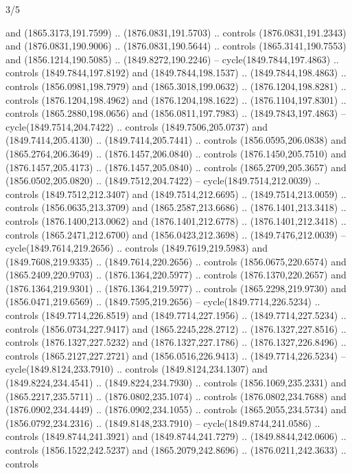 \begin{flagdescription}{3/5}
\begin{scope}[xshift=0.5\flaglength,yshift=0.5\flagwidth,scale=\flagwidth/99]
\begin{scope}[y=0.8pt, x=0.8pt, yscale=-0.20628, xscale=0.20628,shift={(-500,-300)}]
\begin{scope}[cm={{0.79646,0.0,0.0,0.7753,(100.0721,273.79617)}}]
\begin{scope}[cm={{1.1028,0.0,0.0,1.08434,(-41.46868,-11.26981)}}]
  and (1865.3173,191.7599) .. (1876.0831,191.5703) .. controls
  (1876.0831,191.2343) and (1876.0831,190.9006) .. (1876.0831,190.5644) ..
  controls (1865.3141,190.7553) and (1856.1214,190.5085) .. (1849.8272,190.2246)
  -- cycle(1849.7844,197.4863) .. controls (1849.7844,197.8192) and
  (1849.7844,198.1537) .. (1849.7844,198.4863) .. controls (1856.0981,198.7979)
  and (1865.3018,199.0632) .. (1876.1204,198.8281) .. controls
  (1876.1204,198.4962) and (1876.1204,198.1622) .. (1876.1104,197.8301) ..
  controls (1865.2880,198.0656) and (1856.0811,197.7983) .. (1849.7843,197.4863)
  -- cycle(1849.7514,204.7422) .. controls (1849.7506,205.0737) and
  (1849.7414,205.4130) .. (1849.7414,205.7441) .. controls (1856.0595,206.0838)
  and (1865.2764,206.3649) .. (1876.1457,206.0840) .. controls
  (1876.1450,205.7510) and (1876.1457,205.4173) .. (1876.1457,205.0840) ..
  controls (1865.2709,205.3657) and (1856.0502,205.0820) .. (1849.7512,204.7422)
  -- cycle(1849.7514,212.0039) .. controls (1849.7512,212.3407) and
  (1849.7514,212.6695) .. (1849.7514,213.0059) .. controls (1856.0635,213.3709)
  and (1865.2587,213.6686) .. (1876.1401,213.3418) .. controls
  (1876.1400,213.0062) and (1876.1401,212.6778) .. (1876.1401,212.3418) ..
  controls (1865.2471,212.6700) and (1856.0423,212.3698) .. (1849.7476,212.0039)
  -- cycle(1849.7614,219.2656) .. controls (1849.7619,219.5983) and
  (1849.7608,219.9335) .. (1849.7614,220.2656) .. controls (1856.0675,220.6574)
  and (1865.2409,220.9703) .. (1876.1364,220.5977) .. controls
  (1876.1370,220.2657) and (1876.1364,219.9301) .. (1876.1364,219.5977) ..
  controls (1865.2298,219.9730) and (1856.0471,219.6569) .. (1849.7595,219.2656)
  -- cycle(1849.7714,226.5234) .. controls (1849.7714,226.8519) and
  (1849.7714,227.1956) .. (1849.7714,227.5234) .. controls (1856.0734,227.9417)
  and (1865.2245,228.2712) .. (1876.1327,227.8516) .. controls
  (1876.1327,227.5232) and (1876.1327,227.1786) .. (1876.1327,226.8496) ..
  controls (1865.2127,227.2721) and (1856.0516,226.9413) .. (1849.7714,226.5234)
  -- cycle(1849.8124,233.7910) .. controls (1849.8124,234.1307) and
  (1849.8224,234.4541) .. (1849.8224,234.7930) .. controls (1856.1069,235.2331)
  and (1865.2217,235.5711) .. (1876.0802,235.1074) .. controls
  (1876.0802,234.7688) and (1876.0902,234.4449) .. (1876.0902,234.1055) ..
  controls (1865.2055,234.5734) and (1856.0792,234.2316) .. (1849.8148,233.7910)
  -- cycle(1849.8744,241.0586) .. controls (1849.8744,241.3921) and
  (1849.8744,241.7279) .. (1849.8844,242.0606) .. controls (1856.1522,242.5237)
  and (1865.2079,242.8696) .. (1876.0211,242.3633) .. controls

\end{scope}
\end{scope}
\end{scope}
\end{scope}
\end{flagdescription}
